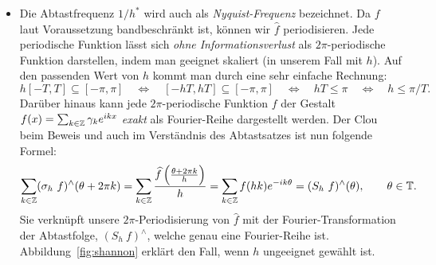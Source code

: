 \begin{remark}
\begin{itemize}
\begin{figure}[ht]
{  	grüne Funktion nicht rekonstruiert werden, da auch eine zweite Funktion (rot) gefunden werden 
  	kann, welche den Punkten genau entspricht. Die Abtastweite wurde zu groß gewählt.}
  	\label{fig:aliasing}
  \end{figure}
\item Die Abtastfrequenz $ 1 / h^{*} $ wird auch als \emph{Nyquist-Frequenz} bezeichnet. Da $ f $ 
laut
  Voraussetzung bandbeschränkt ist, können wir $ \widehat{f} $ periodisieren. Jede periodische
  Funktion lässt sich \emph{ohne Informationsverlust} als $ 2\pi $-periodische Funktion darstellen, 
  indem man geeignet skaliert (in unserem Fall mit $ h $). Auf den passenden Wert von $ h $ kommt 
  man durch eine sehr einfache Rechnung:
  \[
    h [-T, T] \subseteq [-\pi, \pi] \quad \Leftrightarrow \quad 
    [-hT, hT] \subseteq [-\pi, \pi] \quad \Leftrightarrow \quad 
    hT \leq \pi \quad \Leftrightarrow \quad 
    h \leq \pi / T.
  \]
  Darüber hinaus kann jede $ 2\pi $-periodische Funktion $ f $ der Gestalt
  $ f(x) = \sum_{k \in \mathbb{Z}} \gamma_{k}e^{ikx} $ \emph{exakt} als Fourier-Reihe dargestellt werden. 
  Der Clou beim Beweis und auch im Verständnis des Abtastsatzes ist nun folgende Formel:
  \[
      \sum_{k \in \mathbb{Z}} (\sigma_{h} \ f)^{\wedge}(\theta + 2 \pi k)
    = \sum_{k \in \mathbb{Z}} \frac{\widehat{f} \left( \frac{\theta + 2\pi k}{h} \right)}{h}
    = \sum_{k \in \mathbb{Z}} f(hk) e^{-ik\theta} 
    = (S_{h} \ f)^{\wedge}(\theta),
      \qquad \theta \in \mathbb{T}.
  \]
  Sie verknüpft unsere $ 2\pi $-Periodisierung von $ \widehat{f} $ mit der Fourier-Transformation 
  der Abtastfolge, $ (S_{h} \ f)^{\wedge} $, welche genau eine Fourier-Reihe ist. 
  Abbildung~\ref{fig:shannon} erklärt den Fall, wenn $ h $ ungeeignet gewählt ist.
  \begin{figure}[ht]
  \centering
  \begin{minipage}{0.49\linewidth}
  \end{minipage}
  \hfill
  \begin{minipage}{0.49\linewidth}
\end{minipage}
\end{figure}
\end{itemize}
\end{remark}
